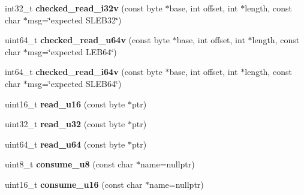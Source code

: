\begin{DoxyCompactItemize}
\item 
int32\+\_\+t {\bfseries checked\+\_\+read\+\_\+i32v} (const byte $\ast$base, int offset, int $\ast$length, const char $\ast$msg=\char`\"{}expected S\+L\+E\+B32\char`\"{})\hypertarget{classv8_1_1internal_1_1wasm_1_1_decoder_a3cf4f162282ebebb241cd35777b52fce}{}\label{classv8_1_1internal_1_1wasm_1_1_decoder_a3cf4f162282ebebb241cd35777b52fce}

\item 
uint64\+\_\+t {\bfseries checked\+\_\+read\+\_\+u64v} (const byte $\ast$base, int offset, int $\ast$length, const char $\ast$msg=\char`\"{}expected L\+E\+B64\char`\"{})\hypertarget{classv8_1_1internal_1_1wasm_1_1_decoder_af6269818a571fce9932415824d67af6a}{}\label{classv8_1_1internal_1_1wasm_1_1_decoder_af6269818a571fce9932415824d67af6a}

\item 
int64\+\_\+t {\bfseries checked\+\_\+read\+\_\+i64v} (const byte $\ast$base, int offset, int $\ast$length, const char $\ast$msg=\char`\"{}expected S\+L\+E\+B64\char`\"{})\hypertarget{classv8_1_1internal_1_1wasm_1_1_decoder_a32fc06b08e20e208a60976e398a02683}{}\label{classv8_1_1internal_1_1wasm_1_1_decoder_a32fc06b08e20e208a60976e398a02683}

\item 
uint16\+\_\+t {\bfseries read\+\_\+u16} (const byte $\ast$ptr)\hypertarget{classv8_1_1internal_1_1wasm_1_1_decoder_a73135248172a521c81080cb0e2f718eb}{}\label{classv8_1_1internal_1_1wasm_1_1_decoder_a73135248172a521c81080cb0e2f718eb}

\item 
uint32\+\_\+t {\bfseries read\+\_\+u32} (const byte $\ast$ptr)\hypertarget{classv8_1_1internal_1_1wasm_1_1_decoder_a92edbd918cf7876dd2b523b303a94882}{}\label{classv8_1_1internal_1_1wasm_1_1_decoder_a92edbd918cf7876dd2b523b303a94882}

\item 
uint64\+\_\+t {\bfseries read\+\_\+u64} (const byte $\ast$ptr)\hypertarget{classv8_1_1internal_1_1wasm_1_1_decoder_a4c93c777b3ae1f324d1d9b24f41665ae}{}\label{classv8_1_1internal_1_1wasm_1_1_decoder_a4c93c777b3ae1f324d1d9b24f41665ae}

\item 
uint8\+\_\+t {\bfseries consume\+\_\+u8} (const char $\ast$name=nullptr)\hypertarget{classv8_1_1internal_1_1wasm_1_1_decoder_ab8c9114e7c6d08ca12bd58eb98f25478}{}\label{classv8_1_1internal_1_1wasm_1_1_decoder_ab8c9114e7c6d08ca12bd58eb98f25478}

\item 
uint16\+\_\+t {\bfseries consume\+\_\+u16} (const char $\ast$name=nullptr)\hypertarget{classv8_1_1internal_1_1wasm_1_1_decoder_afae6d52d177a5b3f157234b6220ac259}{}\label{classv8_1_1internal_1_1wasm_1_1_decoder_afae6d52d177a5b3f157234b6220ac259}


\end{DoxyCompactItemize}
